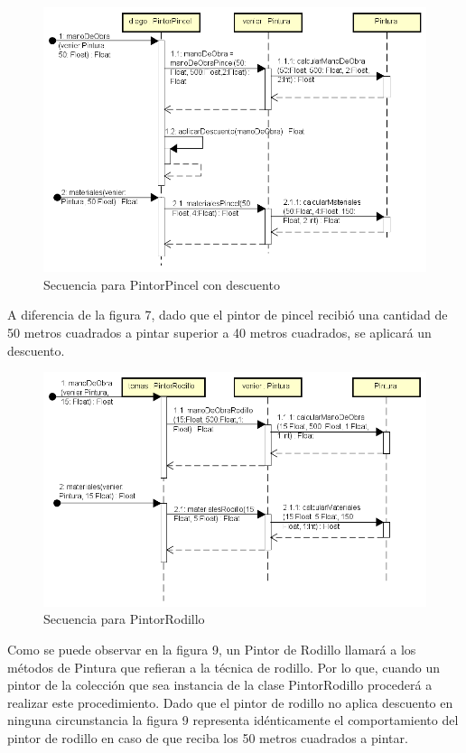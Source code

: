 \documentclass[titlepage,a4paper]{article}
\begin{document}
\begin{figure}[H]
\centering
\includegraphics[width=1.1\textwidth]{Secuencia4_2PincelDescuento.png}
\caption{\label{fig:seq02} Secuencia para PintorPincel con descuento}
\end{figure}
A diferencia de la figura 7, dado que el pintor de pincel recibió una cantidad de 50 metros cuadrados a pintar superior a 40 metros cuadrados, se aplicará un descuento.
\begin{figure}[H]
\centering
\includegraphics[width=1.1\textwidth]{Secuencia5_PincelRodillo.png}
\caption{\label{fig:seq02} Secuencia para PintorRodillo}
\end{figure}
Como se puede observar en la figura 9, un Pintor de Rodillo llamará a los métodos de Pintura que refieran a la técnica de rodillo.
Por lo que, cuando un pintor de la colección que sea instancia de la clase PintorRodillo procederá a realizar este procedimiento.
Dado que el pintor de rodillo no aplica descuento en ninguna circunstancia la figura 9 representa idénticamente el comportamiento del pintor de rodillo en caso de que reciba los 50 metros cuadrados a pintar.
\end{document}
